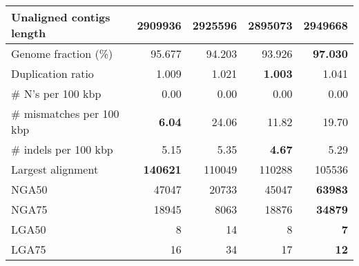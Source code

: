 \documentclass[12pt,a4paper]{article}
\begin{document}
\begin{table}[ht]
\begin{center}
\begin{tabular}{|l*{4}{|r}|}
Unaligned contigs length & 2909936 & 2925596 & {\bf 2895073} & 2949668 \\ \hline
Genome fraction (\%) & 95.677 & 94.203 & 93.926 & {\bf 97.030} \\ \hline
Duplication ratio & 1.009 & 1.021 & {\bf 1.003} & 1.041 \\ \hline
\# N's per 100 kbp & 0.00 & 0.00 & 0.00 & 0.00 \\ \hline
\# mismatches per 100 kbp & {\bf 6.04} & 24.06 & 11.82 & 19.70 \\ \hline
\# indels per 100 kbp & 5.15 & 5.35 & {\bf 4.67} & 5.29 \\ \hline
Largest alignment & {\bf 140621} & 110049 & 110288 & 105536 \\ \hline
NGA50 & 47047 & 20733 & 45047 & {\bf 63983} \\ \hline
NGA75 & 18945 & 8063 & 18876 & {\bf 34879} \\ \hline
LGA50 & 8 & 14 & 8 & {\bf 7} \\ \hline
LGA75 & 16 & 34 & 17 & {\bf 12} \\ \hline
\end{tabular}
\end{center}
\end{table}
\end{document}
